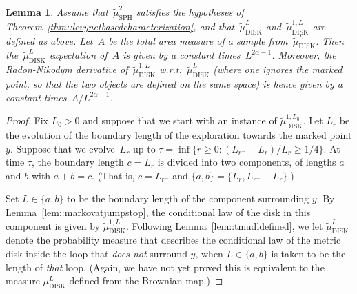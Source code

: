 \documentclass[JEP,XML,SOM,Unicode]{cedram}
\theoremstyle{plain}
\numberwithin{theorem}{section}
\newtheorem{lemma}[theorem]{Lemma}
\theoremstyle{definition}
\newcommand{\mudl}{\mu_{\mathrm{DISK}}^L}
\newcommand{\tmustwo}{\wt{\mu}_{\mathrm{SPH}}^2}
\newcommand{\tmudonel}{\wt{\mu}_{ \mathrm{DISK}}^{1, L}}
\newcommand{\tmudl}{\wt{\mu}_{\mathrm{DISK}}^L}
\def\tmudonelset#1{\wt{\mu}_{ \mathrm{DISK}}^{1, #1}}
\let\wt\widetilde
\begin{document}
\begin{lemma}
\label{lem::tmudlareaexpectation}
Assume that~$\tmustwo$ satisfies the hypotheses of Theorem~\ref{thm::levynetbasedcharacterization}, and that~$\tmudl$ and~$\tmudonel$ are defined as above. Let~$A$ be the total area measure of a sample from~$\tmudl$. Then the~$\tmudl$ expectation of~$A$ is given by a constant times~$L^{2\alpha - 1}$. Moreover, the Radon-Nikodym derivative of~$\tmudonel$ w.r.t.\ $\tmudl$ (where one ignores the marked point, so that the two objects are defined on the same space) is hence given by a constant times~$A/L^{2\alpha - 1}$.
\end{lemma}
\begin{proof}
Fix $L_0 > 0$ and suppose that we start with an instance of $\tmudonelset{L_0}$. Let $L_r$ be the evolution of the boundary length of the exploration towards the marked point $y$. Suppose that we evolve~$L_r$ up to $\tau = \inf\{r \geq 0 : (L_{r^-} - L_r)/L_r \geq 1/4\}$. At time $\tau$, the boundary length $c = L_r$ is divided into two components, of lengths $a$ and $b$ with $a+b=c$. (That is, $c = L_{r^-}$ and $\{a,b\} = \{L_r,L_{r^-} - L_r\}$.)

Set $L \in \{a,b\}$ to be the boundary length of the component surrounding $y$. By Lemma~\ref{lem::markovatjumpstop}, the conditional law of the disk in this component is given by $\tmudonel$. Following Lemma~\ref{lem::tmudldefined}, we let $\tmudl$ denote the probability measure that describes the conditional law of the metric disk inside the loop that \emph{does not} surround $y$, when $L \in \{a, b \}$ is taken to be the length of \emph{that} loop. (Again, we have not yet proved this is equivalent to the measure $\mudl$ defined from the Brownian map.)


\end{proof}
\end{document}
